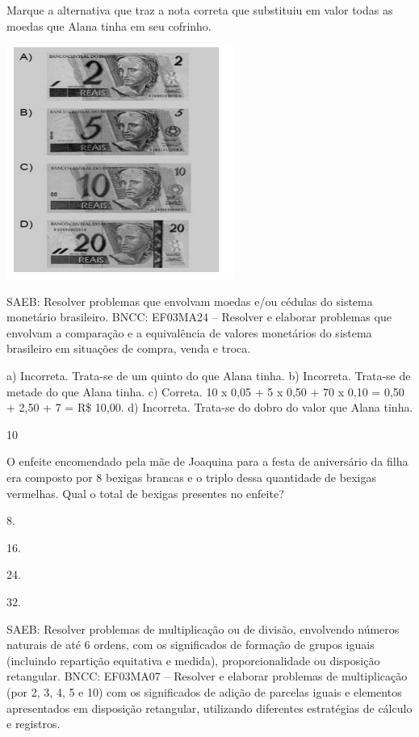\begin{multicols}{2}
\begin{enumerate}
{Marque a alternativa que traz a nota correta que substituiu em valor todas as moedas que Alana tinha em seu cofrinho.


\includegraphics[width=2.93590in,height=3.00930in]{media/image135.png}

SAEB: Resolver problemas que envolvam moedas e/ou cédulas do sistema monetário brasileiro.
BNCC: EF03MA24 -- Resolver e elaborar problemas que envolvam a comparação e a equivalência de
valores monetários do sistema brasileiro em situações de compra, venda e troca.

a) Incorreta. Trata-se de um quinto do que Alana tinha.
b) Incorreta. Trata-se de metade do que Alana tinha.
c) Correta. 10 x 0,05 + 5 x 0,50 + 70 x 0,10 = 0,50 + 2,50 + 7 = R\$ 10,00.
d) Incorreta. Trata-se do dobro do valor que Alana tinha.

\num{10}

O enfeite encomendado pela mãe de Joaquina para a festa de aniversário da filha era composto por 8 bexigas brancas e o triplo dessa quantidade de bexigas vermelhas. Qual o total de bexigas presentes no enfeite?

\begin{escolha}

\item
  8.
\item
  16.
\item
  24.
\item
  32.
\end{escolha}

SAEB: Resolver problemas de multiplicação ou de divisão, envolvendo números naturais de até 6 ordens, com os significados de formação de grupos iguais (incluindo repartição equitativa e medida), proporcionalidade ou disposição retangular.
BNCC: EF03MA07 – Resolver e elaborar problemas de multiplicação (por 2, 3, 4, 5 e 10) com os significados de adição de parcelas iguais e elementos apresentados em disposição retangular, utilizando diferentes estratégias de cálculo e registros.

}
\end{enumerate}
\end{multicols}
